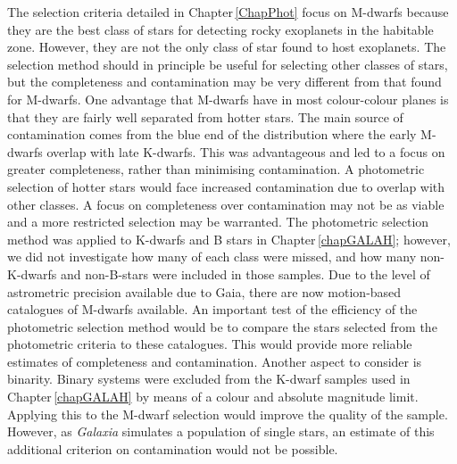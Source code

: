 The selection criteria detailed in Chapter\,\ref{ChapPhot} focus on M-dwarfs because they are the best class of stars for detecting rocky exoplanets in the habitable zone. However, they are not the only class of star found to host exoplanets. The selection method should in principle be useful for selecting other classes of stars, but the completeness and contamination may be very different from that found for M-dwarfs. One advantage that M-dwarfs have in most colour-colour planes is that they are fairly well separated from hotter stars. The main source of contamination comes from the blue end of the distribution where the early M-dwarfs overlap with late K-dwarfs. This was advantageous and led to a focus on greater completeness, rather than minimising contamination. A photometric selection of hotter stars would face increased contamination due to overlap with other classes. A focus on completeness over contamination may not be as viable and a more restricted selection may be warranted. The photometric selection method was applied to K-dwarfs and B stars in Chapter\,\ref{chapGALAH}; however, we did not investigate how many of each class were missed, and how many non-K-dwarfs and non-B-stars were included in those samples. Due to the level of astrometric precision available due to Gaia, there are now motion-based catalogues of M-dwarfs available. An important test of the efficiency of the photometric selection method would be to compare the stars selected from the photometric criteria to these catalogues. This would provide more reliable estimates of completeness and contamination. Another aspect to consider is binarity. Binary systems were excluded from the K-dwarf samples used in Chapter\,\ref{chapGALAH} by means of a colour and absolute magnitude limit. Applying this to the M-dwarf selection would improve the quality of the sample. However, as {\em Galaxia} simulates a population of single stars, an estimate of this additional criterion on contamination would not be possible.\\

